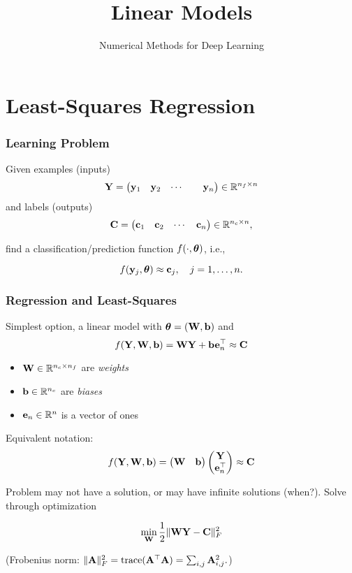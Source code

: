 \documentclass[12pt,fleqn,beamer]{beamer}
\title{Linear Models}
\subtitle{Numerical Methods for Deep Learning}
\date{}
\begin{document}
\makebeamertitle



\section{Least-Squares Regression} 
\label{sec:least_squares_regression}


\begin{frame}\frametitle{Learning Problem}

Given examples (inputs)
$$ {\bf Y} = \begin{pmatrix}  {\bf y}_1 &  {\bf y}_2   & \cdots & & {\bf y}_n \end{pmatrix} \in\mathbb{R}^{n_f\times n}$$
and labels (outputs)
$$ {\bf C} = \begin{pmatrix}  {\bf c}_1  &  {\bf c}_2  & \cdots &  {\bf c}_n \end{pmatrix} \in\mathbb{R}^{n_c\times n},$$

find a classification/prediction function $f(\cdot,{\boldsymbol \theta})$, i.e., 

$$
f({\bf y}_j,{\boldsymbol \theta}) \approx {\bf c}_j, \quad j=1,\ldots,n.
$$

\end{frame} \begin{frame}\frametitle{Regression and Least-Squares}

Simplest option, a linear model with ${\boldsymbol \theta} = ({\bf W},{\bf b})$ and
$$ f({\bf Y},{\bf W},{\bf b}) =  {\bf W} {\bf Y} + {\bf b} {\bf e}_n^\top \approx {\bf C} $$
\begin{itemize}
	\item ${\bf W} \in \mathbb{R}^{n_c \times n_f}$ are \emph{weights}
	\item ${\bf b} \in \mathbb{R}^{n_c}$ are \emph{biases}
	\item ${\bf e}_n \in \mathbb{R}{^n}$ is a vector of ones
\end{itemize} 
Equivalent notation:
$$f({\bf Y},{\bf W},{\bf b}) = \begin{pmatrix} {\bf W} & {\bf b} \end{pmatrix} \begin{pmatrix} {\bf Y} \\ {\bf e}_n^\top \end{pmatrix} \approx {\bf C}$$

Problem may not have a solution, or may have infinite solutions (when?).
Solve through optimization
 
$$ \min_{{\bf W}} {\frac 12} \|{\bf W} {\bf Y} - {\bf C}\|^2_F $$

(Frobenius norm: $\|{\bf A}\|_F^2 = {\rm trace}({\bf A}^{\top} {\bf A}) = \sum_{i,j} {\bf A}_{i,j}^2. $)

\end{frame}
\end{document}
